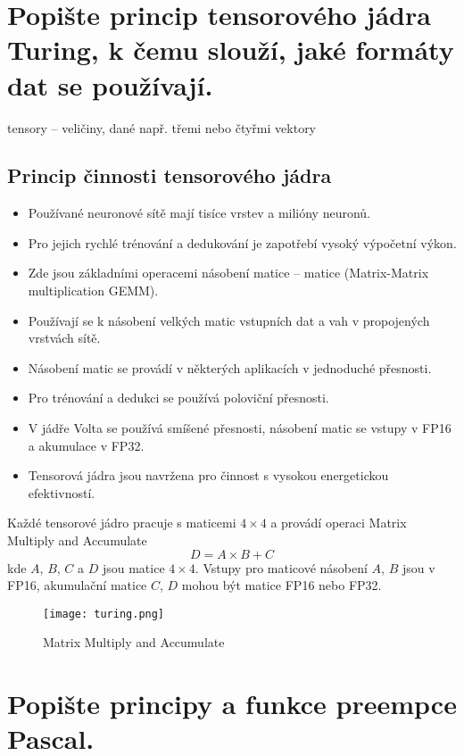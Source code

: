 	
	
	
\section{Popište princip tensorového jádra Turing, k čemu slouží, jaké formáty dat se používají.}
	tensory -- veličiny, dané např. třemi nebo čtyřmi vektory
	
	\subsection*{Princip činnosti tensorového jádra}
	\begin{itemize}
		\setlength\itemsep{0em}
		\item Používané neuronové sítě mají tisíce vrstev a milióny neuronů.
		\item Pro jejich rychlé trénování a dedukování je zapotřebí vysoký výpočetní výkon.
		\item Zde jsou základními operacemi násobení matice – matice (Matrix-Matrix multiplication GEMM).
		\item Používají se k násobení velkých matic vstupních dat a vah v propojených vrstvách sítě.
		\item Násobení matic se provádí v některých aplikacích v jednoduché přesnosti.
		\item Pro trénování a dedukci se používá poloviční přesnosti.
		\item V jádře Volta se používá smíšené přesnosti, násobení matic se vstupy v FP16 a akumulace v FP32.
		\item Tensorová jádra jsou navržena pro činnost s vysokou energetickou efektivností.
	\end{itemize}

	Každé tensorové jádro pracuje s maticemi $4 \times 4$ a provádí operaci Matrix Multiply and Accumulate
	$$D = A \times B + C$$
	kde $A$, $B$, $C$ a $D$ jsou matice $4 \times 4$.
	Vstupy pro maticové násobení $A$, $B$ jsou v FP16, akumulační matice $C$, $D$ mohou být matice FP16 nebo FP32.
	\begin{figure}[h]
		\centering
		\texttt{[image: turing.png]}
		\caption{Matrix Multiply and Accumulate}
		\label{fig:turing}
	\end{figure}
	

\section{Popište principy a funkce preempce Pascal.}
